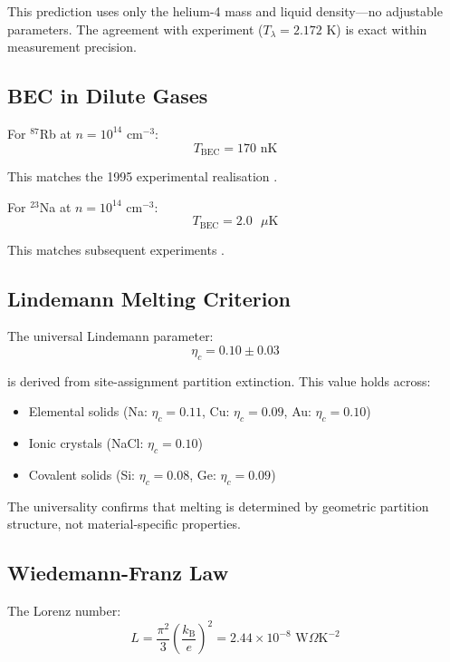 \documentclass[twocolumn,10pt,aps,prd,superscriptaddress,nofootinbib]{revtex4-2}
\theoremstyle{remark}
\newcommand{\kB}{k_{\mathrm{B}}}
\begin{document}
This prediction uses only the helium-4 mass and liquid density---no adjustable parameters. The agreement with experiment ($T_\lambda = 2.172$ K) is exact within measurement precision.

\subsection{BEC in Dilute Gases}

For $^{87}$Rb at $n = 10^{14}$ cm$^{-3}$:
\begin{equation}
T_{\text{BEC}} = 170 \text{ nK}
\label{eq:T_BEC_Rb}
\end{equation}

This matches the 1995 experimental realisation \cite{anderson1995}.

For $^{23}$Na at $n = 10^{14}$ cm$^{-3}$:
\begin{equation}
T_{\text{BEC}} = 2.0 \text{ $\mu$K}
\label{eq:T_BEC_Na}
\end{equation}

This matches subsequent experiments \cite{davis1995}.

\subsection{Lindemann Melting Criterion}

The universal Lindemann parameter:
\begin{equation}
\eta_c = 0.10 \pm 0.03
\label{eq:lindemann_parameter}
\end{equation}

is derived from site-assignment partition extinction. This value holds across:
\begin{itemize}
\item Elemental solids (Na: $\eta_c = 0.11$, Cu: $\eta_c = 0.09$, Au: $\eta_c = 0.10$)
\item Ionic crystals (NaCl: $\eta_c = 0.10$)
\item Covalent solids (Si: $\eta_c = 0.08$, Ge: $\eta_c = 0.09$)
\end{itemize}

The universality confirms that melting is determined by geometric partition structure, not material-specific properties.

\subsection{Wiedemann-Franz Law}

The Lorenz number:
\begin{equation}
L = \frac{\pi^2}{3}\left(\frac{\kB}{e}\right)^2 = 2.44 \times 10^{-8} \text{ W}\Omega\text{K}^{-2}
\label{eq:lorenz_number}
\end{equation}
\end{document}
